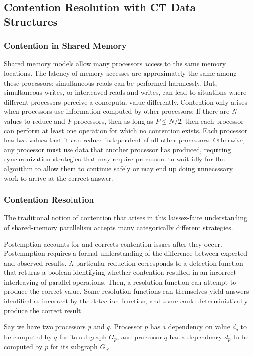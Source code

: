 \documentclass[pageno]{jpaper}
\begin{document}
\subsection{Contention Resolution with CT Data Structures}

\subsubsection{Contention in Shared Memory}
Shared memory models allow many processors access to the same memory locations.
The latency of memory accesses are approximately the same among these
processors; simultaneous reads can be performed harmlessly. But, simultaneous
writes, or interleaved reads and writes, can lead to situations where different
processors perceive a conceputal value differently. Contention
only arises when processors use information computed by other processors: If
there are $N$ values to reduce and $P$ processors, then as long as $P \leq N/2$,
then each processor can perform at least one operation for which no contention
exists. Each processor has two values that it can reduce independent of all
other processors. Otherwise, any processor must use data that another processor
has produced, requiring synchronization strategies that may require processors to wait idly
for the algorithm to allow them to continue safely or may end up doing
unnecessary work to arrive at the correct answer.

\subsubsection{Contention Resolution}
The traditional notion of contention that arises in this
laissez-faire understanding of shared-memory parallelism accepts many
categorically different strategies.

Postemption accounts for and corrects contention issues after they occur.
Postenmption requires a formal understanding of the difference between expected
and observed results. A particular reduction corresponds to a detection function
that returns a boolean identifying whether contention resulted in an incorrect
interleaving of parallel operations. Then, a resolution function can attempt to
produce the correct value. Some resolution functions can themselves yield
answers identified as incorrect by the detection function, and some could
deterministically produce the correct result.

Say we have two processors $p$ and $q$. Processor $p$ has a dependency on value
$d_q$ to be computed by $q$ for its subgraph $G_p$, and processor $q$ has a
dependency $d_p$ to be computed by $p$ for its subgraph $G_q$.
\end{document}
